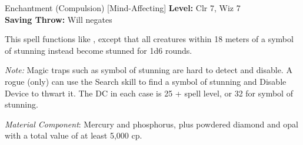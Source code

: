 {Enchantment (Compulsion) [Mind-Affecting]}
{
	\textbf{Level:}
	Clr 7, Wiz 7\\
	\textbf{Saving Throw:}
	Will negates\\
}
{
	This spell functions like , except that all creatures within 18 meters of a symbol of stunning instead become stunned for 1d6 rounds.

	\textit{Note:} Magic traps such as symbol of stunning are hard to detect and disable. A rogue (only) can use the Search skill to find a symbol of stunning and Disable Device to thwart it. The DC in each case is 25 + spell level, or 32 for symbol of stunning.

	\textit{Material Component}:
	Mercury and phosphorus, plus powdered diamond and opal with a total value of at least 5,000 cp.

}
